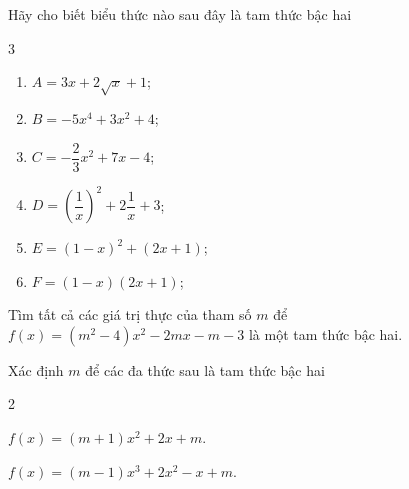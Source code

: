 \begin{bt}%
	Hãy cho biết biểu thức nào  sau đây là tam thức bậc hai
	\begin{multicols}{3}
		\begin{enumerate}
		\item $A=3x+2\sqrt{x}+1$;
		\item $B=-5x^4+3x^2+4$;
		\item $C=-\dfrac{2}{3}x^2+7x-4$;
		\item $D=\left( \dfrac{1}{x}\right)^2+2\dfrac{1}{x}+3$;
		\item $E=\left(1-x\right)^2+(2x+1)$;
		\item $F=\left(1-x\right)(2x+1)$;
	\end{enumerate}
	\end{multicols}

\end{bt}

\begin{bt}%
	Tìm tất cả các giá trị thực của tham số $m$ để $f(x)=(m^2-4)x^2-2mx-m-3$ là một tam thức bậc hai.
\end{bt}

\begin{bt}%
	Xác định $m$ để các đa thức sau là tam thức bậc hai
	\begin{enumEX}{2}
		\item $f(x)=(m + 1) x^2 + 2x + m$.
		\item $f(x)=(m - 1) x^3 + 2x^2 - x + m$.
	\end{enumEX}
\end{bt}

